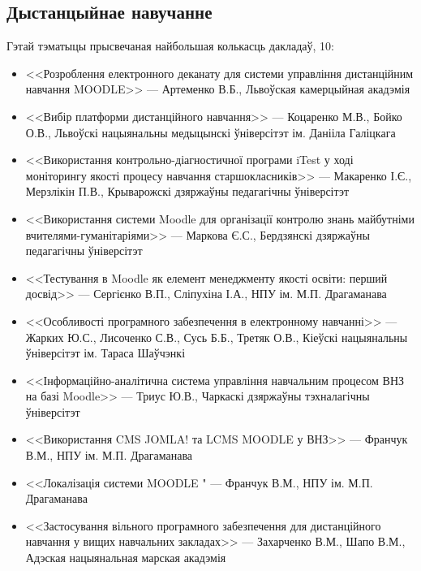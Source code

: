 \documentclass[10pt, a5paper]{article}
\begin{document}
\subsection*{Дыстанцыйнае навучанне}
Гэтай тэматыцы прысвечаная найбольшая колькасць дакладаў, 10:
\begin{itemize}
\item <<Розроблення електронного деканату для системи управління дистанційним навчання MOODLE>> --- Артеменко В.Б., Львоўская камерцыйная акадэмія
\item <<Вибір платформи дистанційного навчання>> --- Коцаренко \linebreak М.В., Бойко О.В.,  Львоўскі нацыянальны медыцынскі ўніверсітэт ім. Данііла Галіцкага
\item <<Використання контрольно-діагностичної програми iTest у \linebreak ході моніторингу якості процесу навчання старшокласників>> --- Макаренко І.Є., Мерзлікін П.В., Крыварожскі дзяржаўны педагагічны ўніверсітэт
\item  <<Використання системи Moodle для організації контролю \linebreak знань майбутніми вчителями-гуманітаріями>> --- Маркова Є.С., Бердзянскі дзяржаўны педагагічны ўніверсітэт
\item  <<Тестування в  Moodle як елемент менеджменту якості освіти: перший досвід>> --- Сергієнко В.П., Сліпухіна І.А., НПУ ім. М.П. Драгаманава
\item  <<Особливості програмного забезпечення в електронному навчанні>> --- Жарких Ю.С., Лисоченко С.В., Сусь Б.Б., Третяк О.В., Кіеўскі нацыянальны ўніверсітэт ім. Тараса Шаўчэнкі
\item  <<Інформаційно-аналітична система управління навчальним \linebreak процесом ВНЗ на базі  Moodle>> --- Триус Ю.В., Чаркаскі дзяржаўны тэхналагічны ўніверсітэт
\item  <<Використання CMS JOMLA!  та LCMS MOODLE у ВНЗ>> --- Франчук В.М., НПУ ім. М.П. Драгаманава
\item <<Локалізація системи MOODLE " --- Франчук В.М., НПУ ім. \linebreak М.П. Драгаманава
\item  <<Застосування вільного програмного забезпечення для дистанційного навчання у вищих навчальних закладах>> --- Захарченко В.М., Шапо В.М., Адэская нацыянальная марская акадэмія
\end{itemize}
\begin{figure}[h!]
\label{pic:fl1}
\end{figure}
\end{document}
